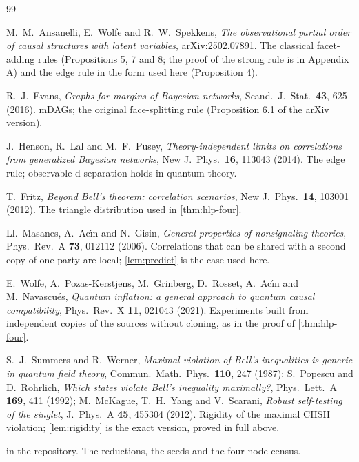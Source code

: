\begin{thebibliography}{99}

 M.~M.~Ansanelli, E.~Wolfe and R.~W.~Spekkens, \emph{The observational partial order of causal
structures with latent variables}, arXiv:2502.07891. The classical facet-adding rules (Propositions 5, 7 and 8; the
proof of the strong rule is in Appendix A) and the edge rule in the form used here (Proposition 4).

 R.~J.~Evans, \emph{Graphs for margins of Bayesian networks}, Scand.\ J.\ Stat.\ \textbf{43}, 625
(2016). mDAGs; the original face-splitting rule (Proposition 6.1 of the arXiv version).

 J.~Henson, R.~Lal and M.~F.~Pusey, \emph{Theory-independent limits on correlations from generalized
Bayesian networks}, New J.\ Phys.\ \textbf{16}, 113043 (2014). The edge rule; observable d-separation holds in
quantum theory.

 T.~Fritz, \emph{Beyond Bell's theorem: correlation scenarios}, New J.\ Phys.\ \textbf{14}, 103001
(2012). The triangle distribution used in \cref{thm:hlp-four}.

 Ll.~Masanes, A.~Ac\'{\i}n and N.~Gisin, \emph{General properties of nonsignaling theories},
Phys.\ Rev.\ A \textbf{73}, 012112 (2006). Correlations that can be shared with a second copy of one party are
local; \cref{lem:predict} is the case used here.

 E.~Wolfe, A.~Pozas-Kerstjens, M.~Grinberg, D.~Rosset, A.~Ac\'{\i}n and M.~Navascu\'es,
\emph{Quantum inflation: a general approach to quantum causal compatibility}, Phys.\ Rev.\ X \textbf{11}, 021043
(2021). Experiments built from independent copies of the sources without cloning, as in the proof of
\cref{thm:hlp-four}.

 S.~J.~Summers and R.~Werner, \emph{Maximal violation of Bell's inequalities is generic in quantum
field theory}, Commun.\ Math.\ Phys.\ \textbf{110}, 247 (1987); S.~Popescu and D.~Rohrlich, \emph{Which states
violate Bell's inequality maximally?}, Phys.\ Lett.\ A \textbf{169}, 411 (1992); M.~McKague, T.~H.~Yang and
V.~Scarani, \emph{Robust self-testing of the singlet}, J.\ Phys.\ A \textbf{45}, 455304 (2012). Rigidity of the
maximal CHSH violation; \cref{lem:rigidity} is the exact version, proved in full above.

  in the  repository. The reductions, the seeds
and the four-node census.

\end{thebibliography}
